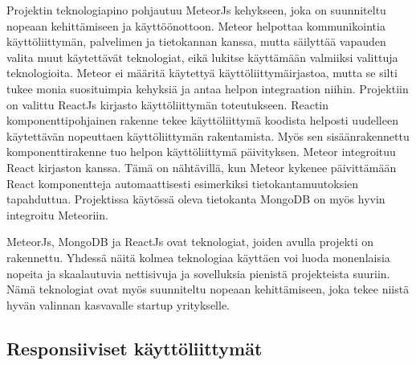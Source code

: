 \documentclass[11pt,a4paper,titlepage,oneside]{article}
\begin{document}
Projektin teknologiapino pohjautuu MeteorJs kehykseen, joka on suunniteltu nopeaan kehittämiseen ja käyttöönottoon.
Meteor helpottaa kommunikointia käyttöliittymän, palvelimen ja tietokannan kanssa, 
mutta säilyttää vapauden valita muut käytettävät teknologiat, eikä lukitse käyttämään valmiiksi valittuja teknologioita.
Meteor ei määritä käytettyä käyttöliittymäirjastoa, mutta se silti tukee monia suosituimpia kehyksiä ja antaa helpon integraation niihin.
Projektiin on valittu ReactJs kirjasto käyttöliittymän toteutukseen.
Reactin komponenttipohjainen rakenne tekee käyttöliittymä koodista helposti uudelleen käytettävän nopeuttaen käyttöliittymän rakentamista. 
Myös sen sisäänrakennettu komponenttirakenne tuo helpon käyttöliittymä päivityksen.
Meteor integroituu React kirjaston kanssa.
Tämä on nähtävillä, kun Meteor kykenee päivittämään React komponentteja automaattisesti esimerkiksi tietokantamuutoksien tapahduttua. 
Projektissa käytössä oleva tietokanta MongoDB on myös hyvin integroitu Meteoriin.
\medskip


MeteorJs, MongoDB ja ReactJs ovat teknologiat, joiden avulla projekti on rakennettu.
Yhdessä näitä kolmea teknologiaa käyttäen voi luoda monenlaisia nopeita ja skaalautuvia nettisivuja ja sovelluksia pienistä projekteista suuriin.
Nämä teknologiat ovat myös suunniteltu nopeaan kehittämiseen, joka tekee niistä hyvän valinnan kasvavalle startup yritykselle.
\medskip









\newpage
{}                %




\newpage
{}%






\newpage
{}        %













\newpage
\subsection{Responsiiviset käyttöliittymät}        %
\end{document}
